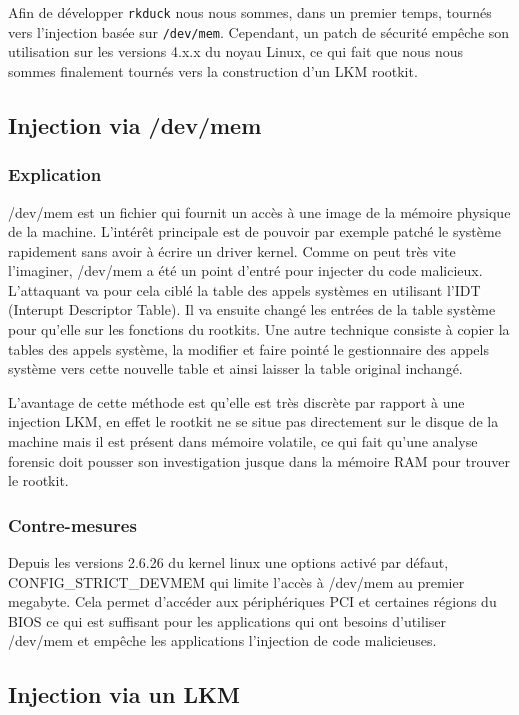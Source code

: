 \documentclass[11pt]{article}
\begin{document}
Afin de développer \texttt{rkduck} nous nous sommes, dans un premier temps, tournés vers l'injection basée sur \texttt{/dev/mem}. Cependant, un patch de sécurité empêche son utilisation sur les versions 4.x.x du noyau Linux, ce qui fait que nous nous sommes finalement tournés vers la construction d'un LKM rootkit.

	\subsection{Injection via /dev/mem}
		\subsubsection{Explication}
	
			/dev/mem est un fichier qui fournit un accès à une image de la mémoire physique de la machine. L'intérêt principale est de pouvoir par exemple patché le système rapidement sans avoir à écrire un driver kernel. Comme on peut très vite l'imaginer, /dev/mem a été un point d'entré pour injecter du code malicieux.	L'attaquant va pour cela ciblé la table des appels systèmes en utilisant l'IDT (Interupt Descriptor Table). Il va ensuite changé les entrées de la table système pour qu'elle sur les fonctions du rootkits. Une autre technique consiste à copier la tables des appels système, la modifier et faire pointé le gestionnaire des appels système vers cette nouvelle table et ainsi laisser la table original inchangé.  
			
			L'avantage de cette méthode est qu'elle est très discrète par rapport à une injection LKM, en effet le rootkit ne se situe pas directement sur le disque de la machine mais il est présent dans mémoire volatile, ce qui fait qu'une analyse forensic doit pousser son investigation jusque dans la mémoire RAM pour trouver le rootkit. 
			
			 
		\subsubsection{Contre-mesures}
			
			Depuis les versions 2.6.26 du kernel linux une options activé par défaut, CONFIG\_STRICT\_DEVMEM qui limite l'accès à /dev/mem au premier megabyte. Cela permet d'accéder aux périphériques PCI et certaines régions du BIOS ce qui est suffisant pour les applications qui ont besoins d'utiliser /dev/mem et empêche les applications l'injection de code malicieuses. 

	\subsection{Injection via un LKM}
\end{document}
